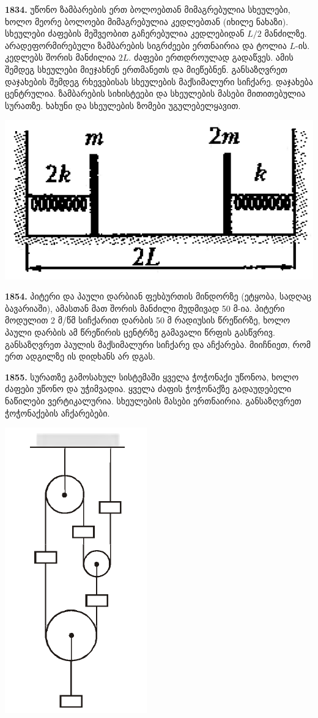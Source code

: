\documentclass[12pt,a4paper,]{report}
\begin{document}
\textbf{1834.} უწონო ზამბარების ერთ ბოლოებთან მიმაგრებულია სხეულები, ხოლო მეორე ბოლოები მიმაგრებულია კედლებთან (იხილე ნახაზი). სხეულები ძაფების მეშვეობით გაჩერებულია კედლებიდან $L/2$ მანძილზე. არადეფორმირებული ზამბარების სიგრძეები ერთნაირია და ტოლია $L$-ის. კედლებს შორის მანძილია $2L$. ძაფები ერთდროულად გადაწვეს. ამის შემდეგ სხეულები მიეჯახნენ ერთმანეთს და მიეწებნენ. განსაზღვრეთ დაჯახების შემდეგ რხევებისას სხეულების მაქსიმალური სიჩქარე. დაჯახება ცენტრულია. ზამბარების სიხისტეები და სხეულების მასები მითითებულია სურათზე. ხახუნი და სხეულების ზომები უგულებელყავით.
	\begin{center}
		\includegraphics[scale=0.4]{images/1834}
	\end{center}

\textbf{1854.} პიტერი და პაული დარბიან ფეხბურთის მინდორზე (ეტყობა, სადღაც ბავარიაში), ამასთან მათ შორის მანძილი მუდმივად 50 მ-ია. პიტერი მოდულით 2 მ/წმ სიჩქარით დარბის 50 მ რადიუსის წრეწირზე, ხოლო პაული დარბის ამ წრეწირის ცენტრზე გამავალი წრფის გასწვრივ. განსაზღვრეთ პაულის მაქსიმალური სიჩქარე და აჩქარება. მიიჩნიეთ, რომ ერთ ადგილზე ის დიდხანს არ დგას.

\textbf{1855.} სურათზე გამოსახულ სისტემაში ყველა ჭოჭონაქი უწონოა, ხოლო ძაფები უწონო და უჭიმვადია. ყველა ძაფის ჭოჭონაქზე გადაუდებელი ნაწილები ვერტიკალურია. სხეულების მასები ერთნაირია. განსაზღვრეთ ჭოჭონაქების აჩქარებები. 
		\begin{center}
			\includegraphics[scale=0.5]{images/F1855.png}
		\end{center}
	
\end{document}
